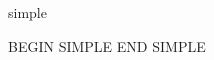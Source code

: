 \documentclass[12pt]{pnpprep}
\begin{document}
\begin{blueprint}{simple}
    \begin{render}
        BEGIN SIMPLE
        END SIMPLE
    \end{render}
\end{blueprint}

\begin{simple}
\end{simple}
\end{document}
